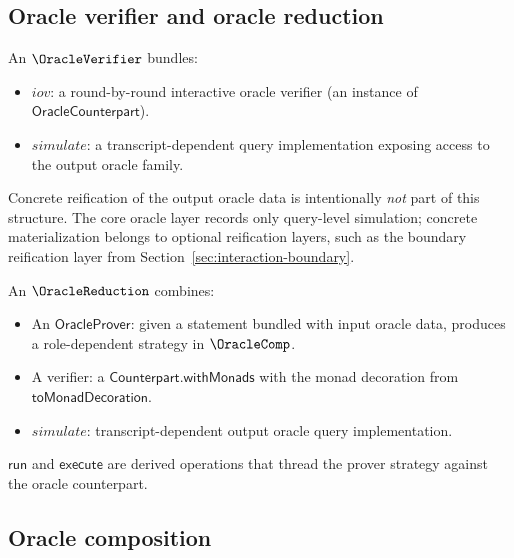 \subsection{Oracle verifier and oracle reduction}

\begin{definition}[OracleVerifier]
  \label{int:oracle-verifier}
  An $\OracleVerifier$ bundles:
  \begin{itemize}
    \item $\mathit{iov}$: a round-by-round interactive oracle verifier
      (an instance of $\mathsf{OracleCounterpart}$).
    \item $\mathit{simulate}$: a transcript-dependent query implementation
      exposing access to the output oracle family.
  \end{itemize}
  Concrete reification of the output oracle data is intentionally \emph{not}
  part of this structure.  The core oracle layer records only query-level
  simulation; concrete materialization belongs to optional reification layers,
  such as the boundary reification layer from
  Section~\ref{sec:interaction-boundary}.
\end{definition}

\begin{definition}[OracleReduction]
  \label{int:oracle-reduction}
  An $\OracleReduction$ combines:
  \begin{itemize}
    \item An $\mathsf{OracleProver}$: given a statement bundled with input
      oracle data, produces a role-dependent strategy in $\OracleComp$.
    \item A verifier: a $\mathsf{Counterpart.withMonads}$ with the monad
      decoration from $\mathsf{toMonadDecoration}$.
    \item $\mathit{simulate}$: transcript-dependent output oracle query
      implementation.
  \end{itemize}
  $\mathsf{run}$ and $\mathsf{execute}$ are derived operations that thread the
  prover strategy against the oracle counterpart.
\end{definition}

\subsection{Oracle composition}

